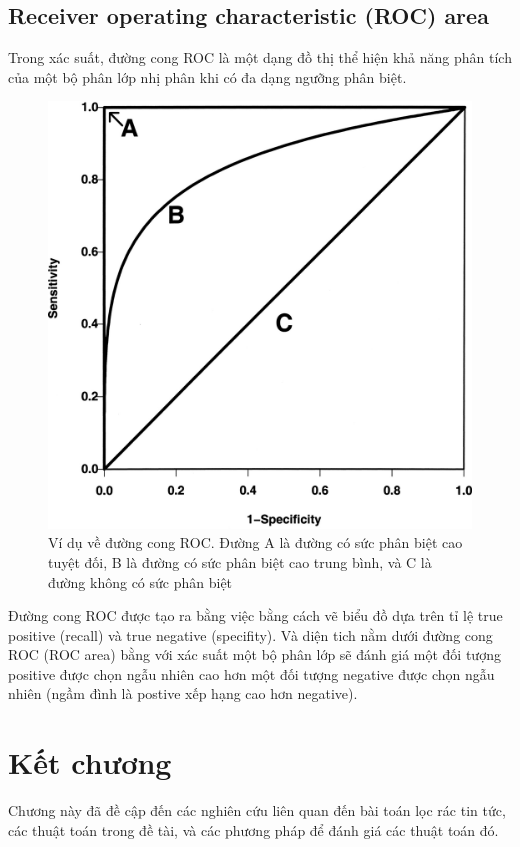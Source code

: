 \subsection{Receiver operating characteristic (ROC) area}
Trong  xác suất, đường cong ROC là một dạng đồ thị thể hiện khả năng phân tích của một bộ phân lớp nhị phân khi có đa dạng ngưỡng phân biệt.
\begin{figure}[H]
\centering
\includegraphics[width=0.9\linewidth]{Chapter2/Chapter2Figs/ROC.png}
\caption{Ví dụ về đường cong ROC\@. Đường A là đường có sức phân biệt cao tuyệt đối, B là đường có sức phân biệt cao trung bình, và C là đường không có sức phân biệt}
\end{figure}
Đường cong ROC được tạo ra bằng việc bằng cách vẽ biểu đồ dựa trên tỉ lệ true positive (recall) và true negative (specifity). Và diện tich nằm dưới đường cong ROC (ROC area) bằng với xác suất một bộ phân lớp sẽ đánh giá một đối tượng positive được chọn ngẫu nhiên cao hơn một đối tượng negative được chọn ngẫu nhiên (ngầm đình là postive xếp hạng cao hơn negative)\cite{Fawcett:2006:IRA:1159473.1159475}.

\section{Kết chương}
Chương này đã đề cập đến các nghiên cứu liên quan đến bài toán lọc rác tin tức, các thuật toán trong đề tài, và các phương pháp để đánh giá các thuật toán đó.
